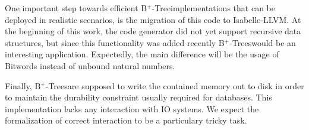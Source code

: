 \documentclass[a4paper,UKenglish,cleveref, autoref, thm-restate]{lipics-v2021}
\newcommand{\btree}{B$^+$-Tree}
\newcommand{\btrees}{B$^+$-Trees}
\begin{document}
One important step towards efficient
\btree implementations that can be deployed
in realistic scenarios, is the migration of this code
to Isabelle-LLVM. \cite{DBLP:conf/itp/Lammich19}
At the beginning of this work, the code generator did
not yet support recursive data structures, but since
this functionality was added recently \btrees would be an interesting application.
Expectedly, the main difference will be the usage of Bitwords
instead of unbound natural numbers.

Finally, \btrees are supposed to write the contained
memory out to disk in order to maintain the durability constraint
usually required for databases.
This implementation lacks any interaction with IO systems.
We expect the formalization of correct interaction 
to be a particulary tricky task.



\end{document}

